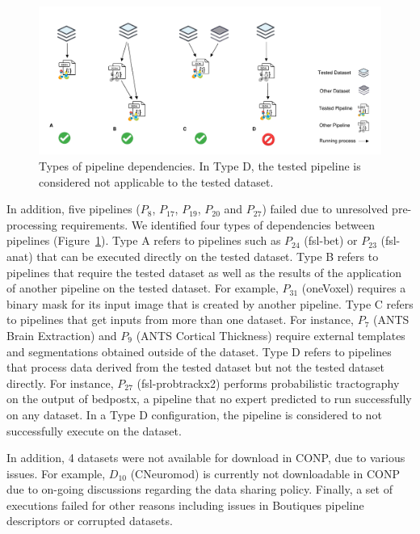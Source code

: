 \documentclass[conference]{IEEEtran}
\begin{document}
\begin{figure}[hbt!]
\centering%
\includegraphics[width=\textwidth]{figures/Pipeline dependencies.pdf}
\caption{Types of pipeline dependencies. In Type D, the tested pipeline 
is considered not applicable to the tested dataset. }
\label{fig:pipeline_dependencies}
\end{figure}
In addition, five pipelines ($P_{8}$, $P_{17}$, $P_{19}$, $P_{20}$ and
$P_{27}$) failed due to unresolved pre-processing requirements. We
identified four types of dependencies between pipelines
(Figure~\ref{fig:pipeline_dependencies}). Type A refers to pipelines such
as $P_{24}$ (fsl-bet) or $P_{23}$ (fsl-anat) that can be executed directly
on the tested dataset. Type B refers to pipelines that require the tested
dataset as well as the results of the application of another pipeline on
the tested dataset. For example, $P_{31}$ (oneVoxel) requires a binary mask
for its input image that is created by another pipeline. Type C refers
to pipelines that get inputs from more than one dataset. For instance, $P_7$
(ANTS Brain Extraction) and $P_9$ (ANTS Cortical Thickness) require
external templates and segmentations obtained outside of the dataset. Type
D refers to pipelines that process data derived from the tested dataset but not
the tested dataset directly.  For instance, $P_{27}$ (fsl-probtrackx2) performs
probabilistic tractography on the output of bedpostx, a pipeline that
no expert predicted to run successfully on any dataset. In a Type D
configuration, the pipeline is considered to not successfully execute on
the dataset. 

In addition, 4 datasets were not available for download in CONP, due to
various issues. For example, $D_{10}$ (CNeuromod) is currently not
downloadable in CONP due to on-going discussions regarding the data sharing policy.
Finally, a set of executions failed for other reasons including issues in
Boutiques pipeline descriptors or corrupted datasets.
\end{document}
